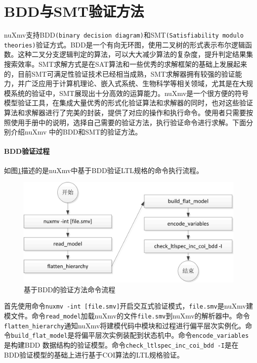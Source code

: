 \section{BDD与SMT验证方法}
nuXmv支持BDD\verb|(binary decision diagram)|\cite{rr3}和SMT\verb|(Satisfiability modulo theories)|\cite{rr4}验证方式。BDD是一个有向无环图，使用二叉树的形式表示布尔逻辑函数。这种二叉分支逻辑判定的算法，可以大大减少算法的复杂度，提升判定结果集搜索效率。SMT求解方式是在SAT算法和一些优秀的求解框架的基础上发展起来的，目前SMT可满足性验证技术已经相当成熟，SMT求解器拥有较强的验证能力，并广泛应用于计算机理论、嵌入式系统、生物科学等相关领域，尤其是在大规模系统的验证中，SMT展现出十分高效的运算能力。nuXmv是一个很方便的符号模型验证工具，在集成大量优秀的形式化验证算法和求解器的同时，也对这些验证算法和求解器进行了完美的封装，提供了对应的操作和执行命令。使用者只需要按照使用手册中的说明，选择自己需要的验证方法，执行验证命令进行求解。下面分别介绍nuXmv 中的BDD和SMT的验证方法。

\paragraph{BDD验证过程}
如图\ref{fig:bddcommod}描述的是nuXmv中基于BDD验证LTL规格的命令执行流程。

\begin{figure}[!hbt]
	\centering
	\includegraphics[width=5 in]{fig/bddcommod.png}
	\caption{基于BDD的验证方法命令流程}
	\label{fig:bddcommod}
\end{figure}

首先使用命令\verb|nuxmv -int [file.smv]|开启交互式验证模式，\verb|file.smv|是nuXmv建模文件。命令\verb|read_model|加载nuXmv的文件\verb|file.smv|到nuXmv的解析器中。命令\verb|flatten_hierarchy|通知nuXmv将建模代码中模块和过程进行偏平层次实例化。命令\verb|build_flat_model|是将偏平层次实例装配到状态机中。命令\verb|encode_variables|是构建BDD 数据结构的验证模型。命令\verb|check_ltlspec_inc_coi_bdd -I|是在BDD验证模型的基础上进行基于COI算法的LTL规格验证。

